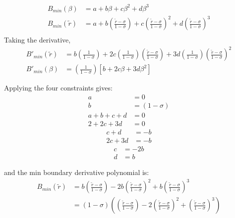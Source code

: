 \documentclass[a4paper]{article}
\begin{document}
\begin{align*}
    B_{min} \left( \beta \right) &= 
    a + b \beta + c \beta^2 + d \beta^3                   \\
    B_{min} \left( \widetilde{r} \right) &= 
    a + b \left( \frac{\widetilde{r} - \sigma}{1 - \sigma} \right)+
    c\left( \frac{\widetilde{r} - \sigma}{1 - \sigma} \right)  ^2+
    d\left( \frac{\widetilde{r} - \sigma}{1 - \sigma} \right)^3                    \\
\end{align*}
Taking the derivative,
\begin{align*}
    B'_{min} \left( \widetilde{r} \right) &= 
    b \left( \frac{1}{1 - \sigma} \right)+
    2 c\left( \frac{1}{1 - \sigma} \right)\left( \frac{\widetilde{r} - \sigma}{1 - \sigma} \right)  +
    3 d\left( \frac{1}{1-\sigma} \right)\left( \frac{\widetilde{r} - \sigma}{1 - \sigma} \right)^2\\
    B'_{min} \left( \beta \right) &= 
    \left( \frac{1}{1 - \sigma} \right)
    \left[
    b +
    2 c \beta + 
    3 d \beta^2
    \right]
\end{align*}


Applying the four constraints gives:
\begin{align*}
    a &= 0\\
    b &= \left( 1 - \sigma \right) \\
    a + b + c + d &= 0\\
    2 + 2c + 3d &= 0
\end{align*}
\begin{align*}
    c + d &= -b  \\
    2c + 3d &= -b
\end{align*}
\begin{align*}
    c &= -2b \\
    d &= b
\end{align*}

and the min boundary derivative polynomial is: 
\begin{align*}
    B_{min}\left( \widetilde{r} \right) &= 
    b \left( \frac{\widetilde{r} - \sigma }{1 - \sigma}\right) -
    2b\left( \frac{\widetilde{r} - \sigma }{1 - \sigma}\right) ^2 +
    b \left( \frac{\widetilde{r} - \sigma }{1 - \sigma}\right)^3 \\
    &=  \left( 1 - \sigma \right)
    \left( \left( \frac{\widetilde{r} - \sigma }{1 - \sigma}\right)  - 
    2\left( \frac{\widetilde{r} - \sigma }{1 - \sigma}\right)^2 +
    \left( \frac{\widetilde{r} - \sigma }{1 - \sigma}\right)^3\right)
\end{align*} 
\end{document}
